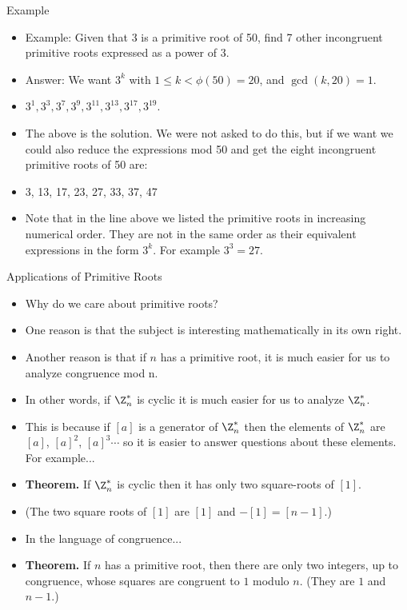 \documentclass{beamer}
\begin{document}
\begin{frame}{Example}

\begin{itemize}
  \item Example: Given that 3 is a primitive root of 50, find 7 other incongruent primitive roots expressed as a power of 3.
  \item Answer: We want $3^k$ with $1\leq k < \phi(50)=20$, and $\gcd(k,20)=1$.
  \item $3^1,3^3,3^7,3^9,3^{11},3^{13},3^{17},3^{19}$.
  \item The above is the solution. We were not asked to do this, but if we want we could also reduce the expressions mod 50 and get
  the eight incongruent primitive roots of 50 are:
  \item 3, 13, 17, 23, 27, 33, 37, 47
  \item Note that in the line above we listed the primitive roots in increasing numerical order. They are not in the same order as their
  equivalent expressions in the form $3^k$. For example $3^3 = 27$.
\end{itemize}

\end{frame}

\begin{frame}{Applications of Primitive Roots}

\begin{itemize}
  \item Why do we care about primitive roots?
  \item One reason is that the subject is interesting mathematically in its own right.
  \item Another reason is that if $n$ has a primitive root, it is much easier for us to
  analyze congruence mod n.
  \item In other words, if $\Z_n^*$ is cyclic it is much easier for us to analyze $\Z_n^*$.
  \item This is because if $[a]$ is a generator of $\Z_n^*$ then the elements of
  $\Z_n^*$ are $[a]$, $[a]^2$, $[a]^3\cdots$ so it is easier to answer questions about these elements. For example...
  \item \textbf{Theorem.} If $\Z_n^*$ is cyclic then it has only two square-roots of $[1]$.
  \item (The two square roots of $[1]$ are $[1]$ and $-[1] = [n-1]$.)
  \item In the language of congruence...
  \item \textbf{Theorem.} If $n$ has a primitive root, then there are only two integers, up to congruence,
  whose squares are congruent to $1$ modulo $n$. (They are $1$ and $n-1$.)
\end{itemize}

\end{frame}
\end{document}
